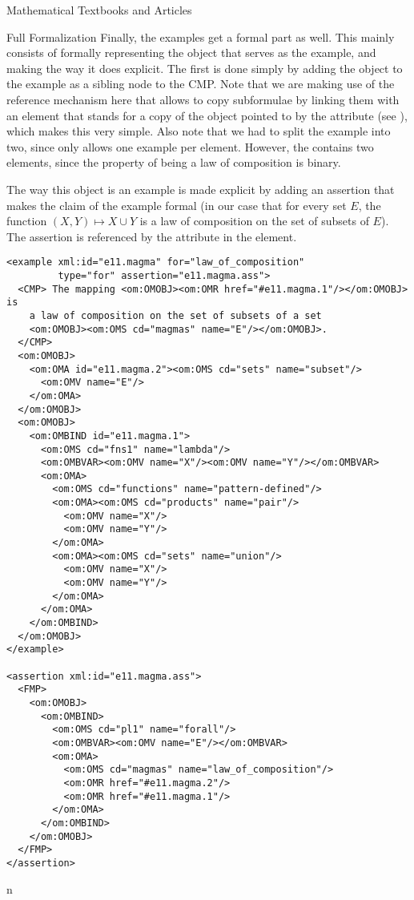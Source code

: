 \begin{tchapter}[id=algebra,short=Textbooks and Articles]{Mathematical Textbooks and Articles}
\begin{tsection}[id=formalization]{Full Formalization}
Finally, the examples get a formal part as well. This mainly consists of formally
representing the object that serves as the example, and making the way it does
explicit. The first is done simply by adding the object to the example as a
sibling node to the CMP. Note that we are making use of the {\openmath} reference
mechanism here that allows to copy subformulae by linking them with an
{} element that stands for a copy of the object pointed to by the
{} attribute (see {}), which makes
this very simple. Also note that we had to split the example into two, since
{\omdoc} only allows one example per {} element. However, the
{} contains two {} elements, since the property of
being a law of composition is binary. 

The way this object is an example is made explicit by adding an assertion that makes the
claim of the example formal (in our case that for every set $E$, the function
$(X,Y)\mapsto X\cup Y$ is a law of composition on the set of subsets of $E$). The
assertion is referenced by the {} attribute in the
{} element.

\begin{lstlisting}[label=lst:magma-formal-examples,frame=topline,
    caption={A  formalized magma example},
    index={example,assertion,CMP,FMP,OMOBJ,OMS,OMA,OMV}]
<example xml:id="e11.magma" for="law_of_composition" 
         type="for" assertion="e11.magma.ass">
  <CMP> The mapping <om:OMOBJ><om:OMR href="#e11.magma.1"/></om:OMOBJ> is 
    a law of composition on the set of subsets of a set 
    <om:OMOBJ><om:OMS cd="magmas" name="E"/></om:OMOBJ>.
  </CMP>
  <om:OMOBJ>
    <om:OMA id="e11.magma.2"><om:OMS cd="sets" name="subset"/>
      <om:OMV name="E"/>
    </om:OMA>
  </om:OMOBJ>
  <om:OMOBJ>
    <om:OMBIND id="e11.magma.1">
      <om:OMS cd="fns1" name="lambda"/>
      <om:OMBVAR><om:OMV name="X"/><om:OMV name="Y"/></om:OMBVAR>
      <om:OMA>
        <om:OMS cd="functions" name="pattern-defined"/>
        <om:OMA><om:OMS cd="products" name="pair"/>
          <om:OMV name="X"/>
          <om:OMV name="Y"/>
        </om:OMA>
        <om:OMA><om:OMS cd="sets" name="union"/>
          <om:OMV name="X"/>
          <om:OMV name="Y"/>
        </om:OMA>
      </om:OMA>
    </om:OMBIND>
  </om:OMOBJ>
</example>

<assertion xml:id="e11.magma.ass">
  <FMP>
    <om:OMOBJ>
      <om:OMBIND>
        <om:OMS cd="pl1" name="forall"/>
        <om:OMBVAR><om:OMV name="E"/></om:OMBVAR>
        <om:OMA>
          <om:OMS cd="magmas" name="law_of_composition"/>
          <om:OMR href="#e11.magma.2"/>
          <om:OMR href="#e11.magma.1"/>
        </om:OMA>
      </om:OMBIND>
    </om:OMOBJ>
  </FMP>
</assertion>
\end{lstlisting}          
\end{tsection}
\end{tchapter} 
n%


